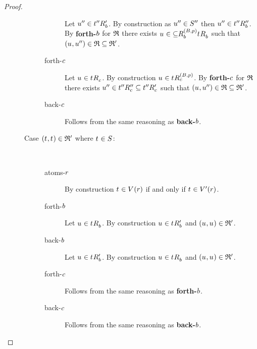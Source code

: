 \begin{proof}
\begin{description}
\begin{description}
\begin{description}
                        Let ${u}^{\prime\prime} \in {{t}^{\prime\prime}} {R^{\prime}_{b}}$.
                        By construction as ${u}^{\prime\prime} \in {S^{\prime\prime}}$ then ${u}^{\prime\prime} \in {{t}^{\prime\prime}} {R^{\prime\prime}_{b}}$.
                        By {\bf forth-$b$} for $\mathfrak{R}$ there exists $\kStateU \in \kSuccessorsB[(\agentsB, \atomP)] \subseteq \kSuccessorsB{\kStateT}$ such that $(\kStateU, \kStateUPP) \in \bisimulation \subseteq \bisimulation'$.
                    \item[forth-$c$]
                        Let $\kStateU \in \kSuccessorsC{\kStateT}$.
                        By construction $\kStateU \in \kSuccessorsC[(\agentsB, \atomP)]{\kStateT}$.
                        By {\bf forth-$c$} for $\mathfrak{R}$ there exists ${u}^{\prime\prime} \in {{t}^{\prime\prime}} {R^{\prime\prime}_{c}} \subseteq {{t}^{\prime\prime}} {R^{\prime}_{c}}$ such that $(\kStateU, \kStateUPP) \in \bisimulation \subseteq \bisimulation'$.
                    \item[back-$c$]
                        Follows from the same reasoning as {\bf back-$b$}.
                \end{description}
            \item[{Case $(\kStateT, \kStateT) \in \bisimulation'$ where $\kStateT \in \kStates$:}]
                \hfill\\
                \begin{description}
                    \item[atoms-$r$] 
                        By construction $\kStateT \in \kValuation(\atomR)$ if and only if $\kStateT \in \kValuationP(\atomR)$.
                    \item[forth-$b$]
                        Let $\kStateU \in \kSuccessorsB{\kStateT}$.
                        By construction $\kStateU \in \kSuccessorsPB{\kStateT}$ and $(\kStateU, \kStateU) \in \bisimulation'$.
                    \item[back-$b$]
                        Let $\kStateU \in \kSuccessorsPB{\kStateT}$.
                        By construction $\kStateU \in \kSuccessorsB{\kStateT}$ and $(\kStateU, \kStateU) \in \bisimulation'$.
                    \item[forth-$c$]
                        Follows from the same reasoning as {\bf forth-$b$}.
                    \item[back-$c$]
                        Follows from the same reasoning as {\bf back-$b$}.
                \end{description}
        \end{description}


\end{description}
\end{proof}
